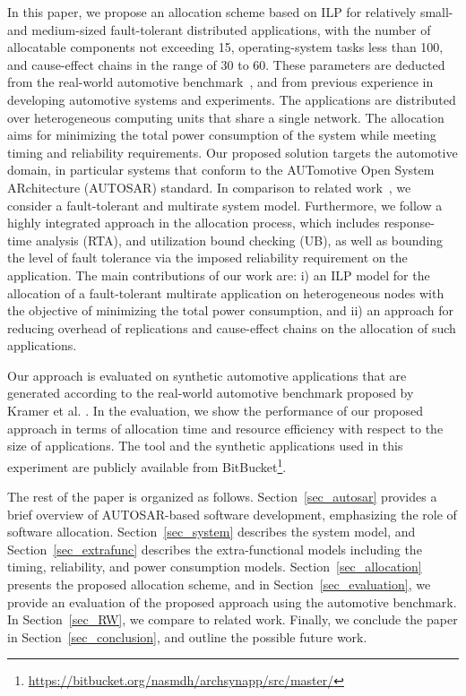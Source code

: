 In this paper, we propose an allocation scheme based on ILP for relatively small- and medium-sized fault-tolerant distributed applications, with the number of allocatable components not exceeding 15, operating-system tasks less than 100, and cause-effect chains in the range of 30 to 60. These parameters are deducted from the real-world automotive benchmark~\cite{Kramer2015RealFree}, and from previous experience in developing automotive systems and experiments. The applications are distributed over heterogeneous computing units that share a single network. The allocation aims for minimizing the total power consumption of the system while meeting timing and reliability requirements. Our proposed solution targets the automotive domain, in particular systems that conform to the AUTomotive Open System ARchitecture (AUTOSAR) standard. In comparison to related work~\cite{Wozniak2013AnArchitectures}\cite{vsvogor2014extended}\cite{Saidi2015AnArchitectures}, we consider a fault-tolerant and multirate system model. Furthermore, we follow a highly integrated approach in the allocation process, which includes response-time analysis (RTA), and utilization bound checking (UB), as well as bounding the level of fault tolerance via the imposed reliability requirement on the application. The main contributions of our work are: i) an ILP model for the allocation of a fault-tolerant multirate application on heterogeneous nodes with the objective of minimizing the total power consumption, and ii) an approach for reducing overhead of replications and cause-effect chains on the allocation of such applications.

Our approach is evaluated on synthetic automotive applications that are generated according to the real-world automotive benchmark proposed by Kramer et al. \cite{Kramer2015RealFree}. In the evaluation, we show the performance of our proposed approach in terms of allocation time and resource efficiency with respect to the size of applications. The tool and the synthetic applications used in this experiment are publicly available from BitBucket\footnote{\url{https://bitbucket.org/nasmdh/archsynapp/src/master/}}. 

The rest of the paper is organized as follows. Section~\ref{sec_autosar} provides a brief overview of AUTOSAR-based software development, emphasizing the role of software allocation. Section~\ref{sec_system} describes the system model, and Section~\ref{sec_extrafunc} describes the extra-functional models including the timing, reliability, and power consumption models. Section~\ref{sec_allocation} presents the proposed allocation scheme, and in Section~\ref{sec_evaluation}, we provide an evaluation of the proposed approach using the automotive benchmark. In Section~\ref{sec_RW}, we compare to related work. Finally, we conclude the paper in Section~\ref{sec_conclusion}, and outline the possible future work.

